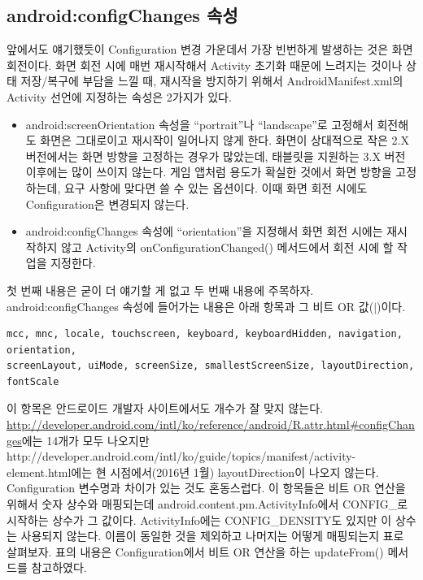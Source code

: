 \subsection{android:configChanges 속성}
앞에서도 얘기했듯이 Configuration 변경 가운데서 가장 빈번하게 발생하는 것은 화면 회전이다. 화면 회전 시에 매번 재시작해서 Activity 초기화 때문에 느려지는 것이나 상태 저장/복구에 부담을 느낄 때, 재시작을 방지하기 위해서 AndroidManifest.xml의 Activity 선언에 지정하는 속성은 2가지가 있다.
\begin{itemize}
\item android:screenOrientation 속성을 ``portrait''나 ``landscape''로 고정해서 회전해도 화면은 그대로이고 재시작이 일어나지 않게 한다. 화면이 상대적으로 작은 2.X 버전에서는 화면 방향을 고정하는 경우가 많았는데, 태블릿을 지원하는 3.X 버전 이후에는 많이 쓰이지 않는다. 게임 앱처럼 용도가 확실한 것에서 화면 방향을 고정하는데, 요구 사항에 맞다면 쓸 수 있는 옵션이다. 이때 화면 회전 시에도 Configuration은 변경되지 않는다.
\item android:configChanges 속성에 ``orientation''을 지정해서 화면 회전 시에는 재시작하지 않고 Activity의 onConfigurationChanged() 메서드에서 회전 시에 할 작업을 지정한다.
\end{itemize}

첫 번째 내용은 굳이 더 얘기할 게 없고 두 번째 내용에 주목하자.
android:configChanges 속성에 들어가는 내용은 아래 항목과 그 비트 OR 값($|$)이다.
\begin{lstlisting}[frame=single]
mcc, mnc, locale, touchscreen, keyboard, keyboardHidden, navigation, orientation, 
screenLayout, uiMode, screenSize, smallestScreenSize, layoutDirection, fontScale
\end{lstlisting}

이 항목은 안드로이드 개발자 사이트에서도 개수가 잘 맞지 않는다. \url{http://developer.android.com/intl/ko/reference/android/R.attr.html\#configChanges}에는 14개가 모두 나오지만 http://developer.android.com/intl/ko/guide/topics/manifest/activity-element.html에는 현 시점에서(2016년 1월) layoutDirection이 나오지 않는다.\\

Configuration 변수명과 차이가 있는 것도 혼동스럽다. 이 항목들은 비트 OR 연산을 위해서 숫자 상수와 매핑되는데 android.content.pm.ActivityInfo에서 CONFIG\_로 시작하는 상수가 그 값이다.
ActivityInfo에는 CONFIG\_DENSITY도 있지만 이 상수는 사용되지 않는다.
이름이 동일한 것을 제외하고 나머지는 어떻게 매핑되는지 표로 살펴보자. 표의 내용은 Configuration에서 비트 OR 연산을 하는 updateFrom() 메서드를 참고하였다.\\


